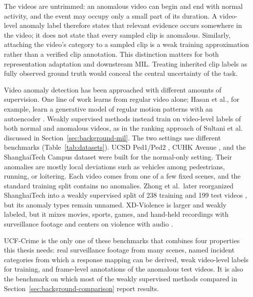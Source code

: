 The videos are untrimmed: an anomalous video can begin and end with normal
activity, and the event may occupy only a small part of its duration. A
video-level anomaly label therefore states that relevant evidence occurs
somewhere in the video; it does not state that every sampled clip is anomalous.
Similarly, attaching the video's category to a sampled clip is a weak training
approximation rather than a verified clip annotation. This distinction matters
for both representation adaptation and downstream MIL. Treating inherited clip
labels as fully observed ground truth would conceal the central uncertainty of
the task.

Video anomaly detection has been approached with different amounts of
supervision. One line of work learns from regular video alone; Hasan et al., for
example, learn a generative model of regular motion patterns with an
autoencoder \cite{hasan2016learning}. Weakly supervised methods instead train
on video-level labels of both normal and anomalous videos, as in the ranking
approach of Sultani et al. discussed in Section~\ref{sec:background-mil}.
The two settings use different benchmarks (Table~\ref{tab:datasets}). UCSD
Ped1/Ped2 \cite{mahadevan2010anomaly}, CUHK Avenue \cite{lu2013abnormal}, and
the ShanghaiTech Campus dataset \cite{liu2018future} were built for the
normal-only setting. Their anomalies are mostly local deviations such as
vehicles among pedestrians, running, or loitering. Each video comes from one of a
few fixed scenes, and the standard training split contains no
anomalies. Zhong et al.\ later reorganized ShanghaiTech into a weakly
supervised split of 238 training and 199 test videos \cite{zhong2019graph}, but
its anomaly types remain unnamed. XD-Violence is larger and weakly labeled, but
it mixes movies, sports, games, and hand-held recordings with surveillance
footage and centers on violence with audio \cite{wu2020not}.

UCF-Crime is the only one of these benchmarks that combines four properties
this thesis needs: real surveillance footage from many scenes, named incident
categories from which a response mapping can be derived, weak video-level
labels for training, and frame-level annotations of the anomalous test videos.
It is also the benchmark on which most of the weakly supervised methods compared
in Section~\ref{sec:background-comparison} report results.

